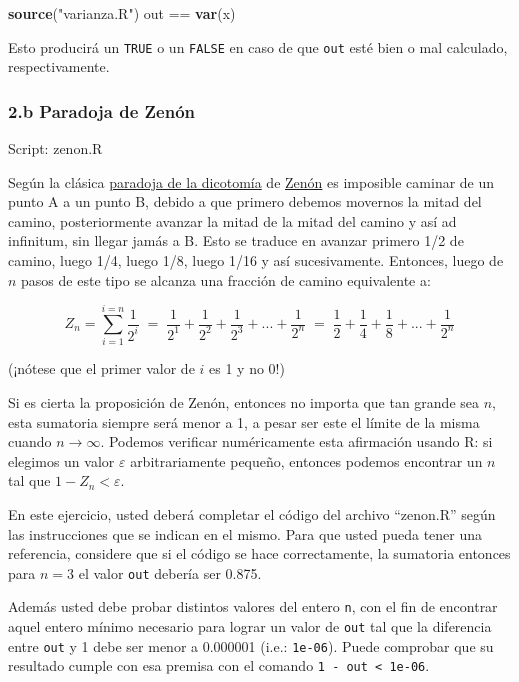 \documentclass[]{article}
\newenvironment{Shaded}{}{}
\newcommand{\KeywordTok}[1]{\textcolor[rgb]{0.00,0.44,0.13}{\textbf{{#1}}}}
\newcommand{\StringTok}[1]{\textcolor[rgb]{0.25,0.44,0.63}{{#1}}}
\newcommand{\NormalTok}[1]{{#1}}
\begin{document}
\begin{Shaded}
\begin{Highlighting}[]
\KeywordTok{source}\NormalTok{(}\StringTok{"varianza.R"}\NormalTok{)}
\NormalTok{out == }\KeywordTok{var}\NormalTok{(x)}
\end{Highlighting}
\end{Shaded}
Esto producirá un \texttt{TRUE} o un \texttt{FALSE} en caso de que
\texttt{out} esté bien o mal calculado, respectivamente.

\subsubsection{2.b Paradoja de Zenón}

Script: zenon.R

Según la clásica
\href{https://es.wikipedia.org/wiki/Paradojas\_de\_Zen\%C3\%B3n\#La\_dicotom.C3.ADa}{paradoja
de la dicotomía} de \href{http://xkcd.com/1153/}{Zenón} es imposible
caminar de un punto A a un punto B, debido a que primero debemos
movernos la mitad del camino, posteriormente avanzar la mitad de la
mitad del camino y así ad infinitum, sin llegar jamás a B. Esto se
traduce en avanzar primero 1/2 de camino, luego 1/4, luego 1/8, luego
1/16 y así sucesivamente. Entonces, luego de $n$ pasos de este tipo se
alcanza una fracción de camino equivalente a:

\[
  Z_n = \sum_{i=1}^{i=n} \frac{1}{2 ^ i} \;=\;
  \frac{1}{2 ^ 1} + \frac{1}{2 ^ 2} + \frac{1}{2 ^ 3} + ... + \frac{1}{2 ^ n} \;=\;
  \frac{1}{2} + \frac{1}{4} + \frac{1}{8} + ... + \frac{1}{2 ^ n}
\]

(¡nótese que el primer valor de $i$ es 1 y no 0!)

Si es cierta la proposición de Zenón, entonces no importa que tan grande
sea $n$, esta sumatoria siempre será menor a 1, a pesar ser este el
límite de la misma cuando $n \to \infty$. Podemos verificar
numéricamente esta afirmación usando R: si elegimos un valor
$\varepsilon$ arbitrariamente pequeño, entonces podemos encontrar un $n$
tal que $1 - Z_n < \varepsilon$.

En este ejercicio, usted deberá completar el código del archivo
``zenon.R'' según las instrucciones que se indican en el mismo. Para que
usted pueda tener una referencia, considere que si el código se hace
correctamente, la sumatoria entonces para $n = 3$ el valor \texttt{out}
debería ser 0.875.

Además usted debe probar distintos valores del entero \texttt{n}, con el
fin de encontrar aquel entero mínimo necesario para lograr un valor de
\texttt{out} tal que la diferencia entre \texttt{out} y 1 debe ser menor
a 0.000001 (i.e.: \texttt{1e-06}). Puede comprobar que su resultado
cumple con esa premisa con el comando
\texttt{1 - out \textless{} 1e-06}.
\end{document}
